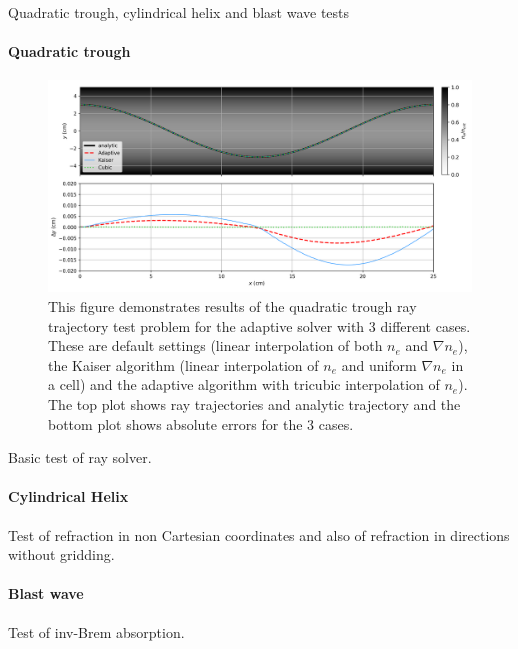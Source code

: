 Quadratic trough, cylindrical helix and blast wave tests

\paragraph*{Quadratic trough}

\begin{figure}[t!]
    \includegraphics[width=\linewidth]{Numerics/Images/Quadtrough.png}
    \centering
    \caption{This figure demonstrates results of the quadratic trough ray trajectory test problem for the adaptive solver with 3 different cases.
    These are default settings (linear interpolation of both $n_e$ and $\nabla n_e$), the Kaiser algorithm (linear interpolation of $n_e$ and uniform $\nabla n_e$ in a cell) and the adaptive algorithm with tricubic interpolation of $n_e$).
    The top plot shows ray trajectories and analytic trajectory and the bottom plot shows absolute errors for the 3 cases.}
    \label{fig:SOLAS_quadtrough}
\end{figure}

Basic test of ray solver.

\paragraph*{Cylindrical Helix}
Test of refraction in non Cartesian coordinates and also of refraction in directions without gridding.

\paragraph*{Blast wave}
Test of \ac{inv-Brem} absorption.

